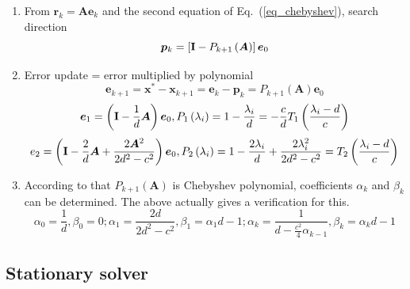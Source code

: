 \begin{enumerate}[label=$\bullet$]
\item From ${{\bm{r}}_k} = {\bm{A}}{{\bm{e}}_k}$ and the second equation of Eq.~(\ref{eq_chebyshev}), search direction
\begin{equation}
{{\bm{p}}_k} = \left[ {{\bf{I}} - {P_{k + 1}}\left( {\bm{A}} \right)} \right]{{\bm{e}}_0}
\end{equation}
\item Error update = error multiplied by polynomial
\begin{equation}
{{\bm{e}}_{k + 1}} = {{\bm{x}}^*} - {{\bm{x}}_{k + 1}} = {{\bm{e}}_k} - {{\bm{p}}_k} = {P_{k + 1}}\left( {\bm{A}} \right){{\bm{e}}_0}
\end{equation}
\begin{equation}
{{\bm{e}}_1} = \left( {{\bf{I}} - \frac{1}{d}{\bm{A}}} \right){{\bm{e}}_0}, 
{P_1}\left( {{\lambda _i}} \right) = 1 - \frac{{{\lambda _i}}}{d} =  - \frac{c}{d}{T_1}\left( {\frac{{{\lambda _i} - d}}{c}} \right)
\end{equation}
\begin{equation}
{e_2} = \left( {{\bf{I}} - \frac{2}{d}{\bm{A}} + \frac{{2{{\bm{A}}^2}}}{{2{d^2} - {c^2}}}} \right){{\bm{e}}_0},{P_2}\left( {{\lambda _i}} \right) = 1 - \frac{{2{\lambda _i}}}{d} + \frac{{2\lambda _i^2}}{{2{d^2} - {c^2}}} = {T_2}\left( {\frac{{{\lambda _i} - d}}{c}} \right)
\end{equation}
\item According to that ${P_{k + 1}}\left( {\bm{A}} \right)$ is Chebyshev polynomial, coefficients $\alpha _k$ and $\beta _k$ can be determined. The above actually gives a verification for this.
\begin{equation}
{\alpha _0} = \frac{1}{d},{\beta _0} = 0;{\alpha _1} = \frac{{2d}}{{2{d^2} - {c^2}}},{\beta _1} = {\alpha _1}d - 1;{\alpha _k} = \frac{1}{{d - \frac{{{c^2}}}{4}{\alpha _{k - 1}}}},{\beta _k} = {\alpha _k}d - 1
\end{equation}
\end{enumerate}

\subsection{Stationary solver}


